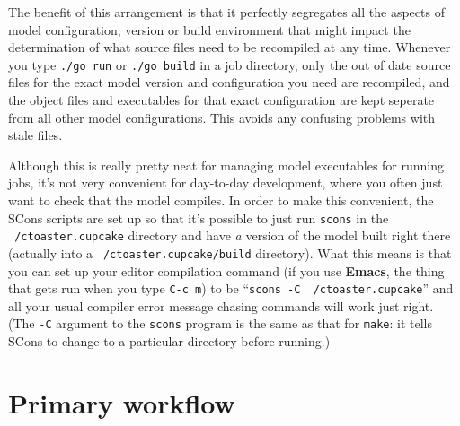\documentclass[a4paper,10pt,article]{memoir}
\begin{document}
The benefit of this arrangement is that it perfectly segregates all
the aspects of model configuration, version or build environment that
might impact the determination of what source files need to be
recompiled at any time.  Whenever you type \texttt{./go run} or
\texttt{./go build} in a job directory, only the out of date source
files for the exact model version and configuration you need are
recompiled, and the object files and executables for that exact
configuration are kept seperate from all other model configurations.
This avoids any confusing problems with stale files.

Although this is really pretty neat for managing model executables for
running jobs, it's not very convenient for day-to-day development,
where you often just want to check that the model compiles.  In order
to make this convenient, the SCons scripts are set up so that it's
possible to just run \texttt{scons} in the \texttt{~/ctoaster.cupcake} directory
and have \emph{a} version of the model built right there (actually
into a \texttt{~/ctoaster.cupcake/build} directory).  What this means is that
you can set up your editor compilation command (if you use \textbf{Emacs}, the
thing that gets run when you type \texttt{C-c m}) to be
``\texttt{scons -C ~/ctoaster.cupcake}'' and all your usual compiler error
message chasing commands will work just right.  (The \texttt{-C}
argument to the \texttt{scons} program is the same as that for
\texttt{make}: it tells SCons to change to a particular directory
before running.) 

\section{Primary workflow}
\end{document}
